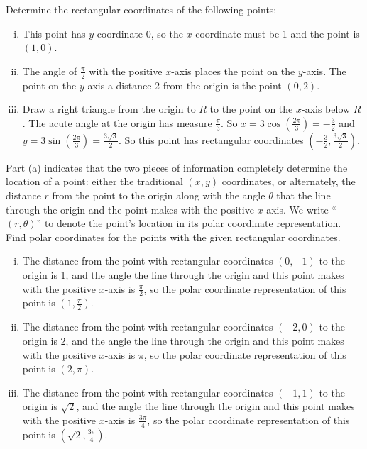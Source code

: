 \begin{activitySolution} 
   \ba
    \item Determine the rectangular coordinates of the following points:
        \begin{enumerate}[i.]
        \item This point has $y$ coordinate 0, so the $x$ coordinate must be 1 and the point is $(1,0)$.

        \item The angle of $\frac{\pi}{2}$ with the positive $x$-axis places the point on the $y$-axis. The point on the $y$-axis a distance 2 from the origin is the point $(0,2)$.

        \item Draw a right triangle from the origin to $R$ to the point on the $x$-axis below $R$. The acute angle at the origin has measure $\frac{\pi}{3}$. So $x = 3\cos\left(\frac{2\pi}{3}\right) = -\frac{3}{2}$ and $y = 3\sin\left(\frac{2\pi}{3}\right) = \frac{3\sqrt{3}}{2}$. So this point has rectangular coordinates $\left(-\frac{3}{2}, \frac{3\sqrt{3}}{2}\right)$.

        \end{enumerate}

    \item Part (a) indicates that the two pieces of information completely determine the location of a point:  either the traditional $(x,y)$ coordinates, or alternately, the distance $r$ from the point to the origin along with the angle $\theta$ that the line through the origin and the point makes with the positive $x$-axis. We write ``$(r, \theta)$'' to denote the point's location in its polar coordinate representation. Find polar coordinates for the points with the given rectangular coordinates.
        \begin{enumerate}[i.]
        \item The distance from the point with rectangular coordinates $(0,-1)$ to the origin is 1, and the angle the line through the origin and this point makes with the positive $x$-axis is $\frac{\pi}{2}$, so the polar coordinate representation of this point is $\left(1,\frac{\pi}{2}\right)$.

	\item The distance from the point with rectangular coordinates $(-2,0)$ to the origin is 2, and the angle the line through the origin and this point makes with the positive $x$-axis is $\pi$, so the polar coordinate representation of this point is $(2,\pi)$.

	\item The distance from the point with rectangular coordinates $(-1,1)$ to the origin is $\sqrt{2}$, and the angle the line through the origin and this point makes with the positive $x$-axis is $\frac{3\pi}{4}$, so the polar coordinate representation of this point is $\left(\sqrt{2},\frac{3\pi}{4}\right)$.



\end{enumerate}
\end{activitySolution}
